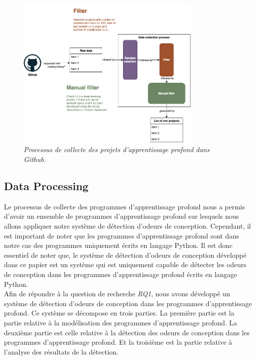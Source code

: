 \begin{figure}[h]
  \centering
  \includegraphics[width=0.8\textwidth]{figure/design_smell_data_collection.png}
  \caption{\emph{Processus de collecte des projets d'apprentissage profond dans Github.}}
  \label{fig:data_collect}
\end{figure}






\subsection{Data Processing}
\label{sec:DataProcessing}
Le processus de collecte des programmes d'apprentissage profond nous a permis
d'avoir un ensemble de programmes d'apprentissage profond sur lesquels nous
allons appliquer notre système de détection d'odeurs de conception. Cependant,
il est important de noter que les programmes d'apprentissage profond sont dans
notre cas des programmes uniquement écrits en langage Python. Il est donc
essentiel de noter que, le système de détection d'odeurs de conception développé
dans ce papier est un système qui est uniquement capable de détecter les odeurs de
conception dans les programmes d'apprentissage profond écrits en langage
Python.\\

Afin de répondre à la question de recherche \emph{RQ1}, nous avons développé un système de détection d'odeurs de
conception dans les programmes d'apprentissage profond. Ce système se décompose
en trois parties. La première partie est la partie relative à la
modélisation des programmes d'apprentissage profond. La
deuxième partie est celle relative à la détection des odeurs de conception
dans les programmes d'apprentissage profond. Et la troisième est la partie
relative à l'analyse des résultats de la détection.\\

